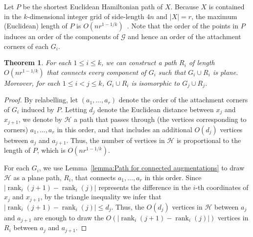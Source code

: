 \documentclass{patmorin}
\newtheorem{theorem}{Theorem}[section]
\DeclareMathOperator{\rank}{rank}
\begin{document}
Let $P$ be the shortest Euclidean Hamiltonian path of $X$. Because $X$ is contained in the $k$-dimensional integer grid of side-length $4n$ and $|X| = r$, the maximum (Euclidean) length of $P$ is $O(nr^{1-1/k})$~\cite{steele.snyder:worst}. Note that the order of the points in $P$ induces an order of the components of $\mathcal G$ and hence an order of the attachment corners of each $G_i$.

\begin{theorem}\label{theorem:main}
For each $1\leq i\leq k$, we can construct a path $R_i$ of length $O(nr^{1-1/k})$ that connects every component of $G_i$ such that $G_i\cup R_i$ is plane. Moreover, for each $1\leq i<j\leq k$, $G_i\cup R_i$ is isomorphic to $G_j\cup R_j$.
\end{theorem}
\begin{proof}
By relabelling, let $(a_1, \ldots, a_r)$ denote the order of the attachment corners of $G_i$ induced by $P$.  Letting $d_j$ denote the Euclidean distance between $x_j$ and $x_{j+1}$, we denote by $\mathcal{H}$ a path that passes through (the vertices corresponding to corners) $a_1, \ldots, a_r$ in this order, and that includes an additional $O(d_j)$ vertices between $a_{j}$ and $a_{j+1}$.  Thus, the number of vertices in $\mathcal{H}$ is proportional to the length of $P$, which is $O(nr^{1-1/k})$.

For each $G_i$, we use Lemma~\ref{lemma:Path for connected augmentations} to draw $\mathcal{H}$ as a plane path, $R_i$, that connects $a_1, \ldots, a_r$ in this order. Since $|\rank_i(j+1) - \rank_i(j)|$ represents the difference in the $i$-th coordinates of $x_j$ and $x_{j+1}$, by the triangle inequality we infer that $|\rank_i(j+1) - \rank_i(j)| \leq  d_j$. Thus, the $O(d_j)$ vertices in $\mathcal{H}$ between $a_j$ and $a_{j+1}$ are enough to
draw the $O(|\rank_i(j+1) - \rank_i(j)|)$ vertices in $R_i$ between $a_j$ and $a_{j+1}$. 




\end{proof}
\end{document}
